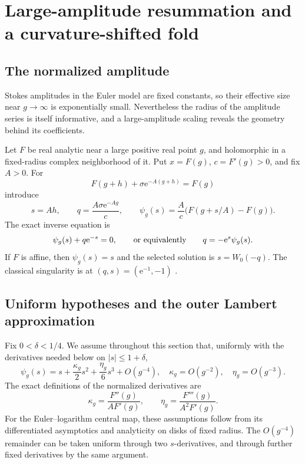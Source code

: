 \documentclass[11pt,a4paper]{article}
\numberwithin{equation}{section}
\theoremstyle{definition}
\theoremstyle{remark}
\newcommand{\e}{\mathrm e}
\begin{document}
\section{Large-amplitude resummation and a curvature-shifted fold}
\label{sec:fold}

\subsection{The normalized amplitude}
Stokes amplitudes in the Euler model are fixed constants, so their effective size near $g\to\infty$ is exponentially small. Nevertheless the radius of the amplitude series is itself informative, and a large-amplitude scaling reveals the geometry behind its coefficients.

Let $F$ be real analytic near a large positive real point $g$, and holomorphic in a fixed-radius complex neighborhood of it. Put $x=F(g)$, $c=F'(g)>0$, and fix $A>0$. For
\[
 F(g+h)+\sigma\e^{-A(g+h)}=F(g)
\]
introduce
\begin{equation}
 s=Ah,\qquad q=\frac{A\sigma\e^{-Ag}}{c},\qquad
 \psi_g(s)=\frac{A}{c}\big(F(g+s/A)-F(g)\big).
 \label{eq:normalization}
\end{equation}
The exact inverse equation is
\begin{equation}
 \psi_g(s)+q\e^{-s}=0,
 \qquad\hbox{or equivalently}\qquad q=-\e^s\psi_g(s).
 \label{eq:normalized}
\end{equation}
If $F$ is affine, then $\psi_g(s)=s$ and the selected solution is
$s=W_0(-q)$. The classical singularity is at $(q,s)=(\e^{-1},-1)$ \cite{dlmf}.

\subsection{Uniform hypotheses and the outer Lambert approximation}
Fix $0<\delta<1/4$. We assume throughout this section that, uniformly with the derivatives needed below on $|s|\leq1+\delta$,
\begin{equation}
 \psi_g(s)=s+\frac{\kappa_g}{2}s^2+\frac{\eta_g}{6}s^3+O(g^{-4}),
 \quad
 \kappa_g=O(g^{-2}),\quad\eta_g=O(g^{-3}).
 \label{eq:psi-jet}
\end{equation}
The exact definitions of the normalized derivatives are
\begin{equation}
 \kappa_g=\frac{F''(g)}{AF'(g)},\qquad
 \eta_g=\frac{F'''(g)}{A^2F'(g)}.
 \label{eq:kappaeta}
\end{equation}
For the Euler--logarithm central map, these assumptions follow from its differentiated asymptotics and analyticity on disks of fixed radius. The $O(g^{-4})$ remainder can be taken uniform through two $s$-derivatives, and through further fixed derivatives by the same argument.
\end{document}
